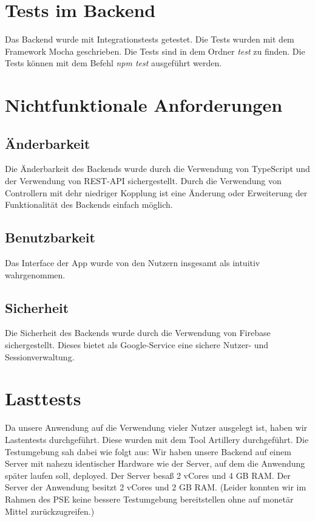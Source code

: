 \documentclass{qualitätssicherungsheft}
\begin{document}
\section{Tests im Backend}
Das Backend wurde mit Integrationstests getestet. Die Tests wurden mit dem Framework Mocha geschrieben. 
Die Tests sind in dem Ordner \textit{test} zu finden. Die Tests können mit dem Befehl \textit{npm test} ausgeführt werden.

\section{Nichtfunktionale Anforderungen}
\subsection{Änderbarkeit}
Die Änderbarkeit des Backends wurde durch die Verwendung von TypeScript und der Verwendung von REST-API sichergestellt.
Durch die Verwendung von Controllern mit dehr niedriger Kopplung ist eine Änderung oder Erweiterung der Funktionalität des Backends einfach möglich.

\subsection{Benutzbarkeit}
Das Interface der App wurde von den Nutzern insgesamt als intuitiv wahrgenommen.

\subsection{Sicherheit}
Die Sicherheit des Backends wurde durch die Verwendung von Firebase sichergestellt. 
Dieses bietet als Google-Service eine sichere Nutzer- und Sessionverwaltung.

\section{Lasttests}
Da unsere Anwendung auf die Verwendung vieler Nutzer ausgelegt ist, haben wir Lastentests durchgeführt.
Diese wurden mit dem Tool Artillery durchgeführt.
Die Testumgebung sah dabei wie folgt aus:
Wir haben unsere Backend auf einem Server mit nahezu identischer Hardware wie der Server, auf dem die Anwendung später laufen soll, deployed.
Der Server besaß 2 vCores und 4 GB RAM.
Der Server der Anwendung besitzt 2 vCores und 2 GB RAM.
(Leider konnten wir im Rahmen des PSE keine bessere Testumgebung bereitstellen ohne auf monetär Mittel zurückzugreifen.)
\end{document}
